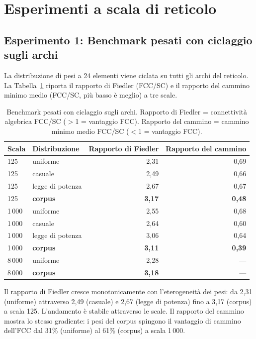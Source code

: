 \documentclass[11pt]{article}
\begin{document}
\section{Esperimenti a scala di reticolo}
\label{sec:lattice}

\subsection{Esperimento 1: Benchmark pesati con ciclaggio sugli archi}

La distribuzione di pesi a 24 elementi viene ciclata su tutti gli archi
del reticolo. La Tabella~\ref{tab:exp1} riporta il rapporto di Fiedler
(FCC/SC) e il rapporto del cammino minimo medio (FCC/SC, pi\`u basso
\`e meglio) a tre scale.

\begin{table}[H]
\centering
\caption{Benchmark pesati con ciclaggio sugli archi. Rapporto di
  Fiedler = connettivit\`a algebrica FCC/SC ($>$1 = vantaggio FCC).
  Rapporto del cammino = cammino minimo medio FCC/SC ($<$1 = vantaggio
  FCC).}
\label{tab:exp1}
\begin{tabular}{llrr}
\toprule
Scala & Distribuzione & Rapporto di Fiedler & Rapporto del cammino \\
\midrule
125  & uniforme   & 2,31 & 0,69 \\
125  & casuale    & 2,49 & 0,66 \\
125  & legge di potenza & 2,67 & 0,67 \\
125  & \textbf{corpus} & \textbf{3,17} & \textbf{0,48} \\
\midrule
1\,000  & uniforme   & 2,55 & 0,68 \\
1\,000  & casuale    & 2,64 & 0,60 \\
1\,000  & legge di potenza & 3,06 & 0,64 \\
1\,000  & \textbf{corpus} & \textbf{3,11} & \textbf{0,39} \\
\midrule
8\,000  & uniforme   & 2,28 & --- \\
8\,000  & \textbf{corpus} & \textbf{3,18} & --- \\
\bottomrule
\end{tabular}
\end{table}

Il rapporto di Fiedler cresce monotonicamente con l'eterogeneit\`a dei
pesi: da 2,31 (uniforme) attraverso 2,49 (casuale) e 2,67 (legge di
potenza) fino a 3,17 (corpus) a scala 125. L'andamento \`e stabile
attraverso le scale. Il rapporto del cammino mostra lo stesso
gradiente: i pesi del corpus spingono il vantaggio di cammino dell'FCC
dal 31\% (uniforme) al 61\% (corpus) a scala 1\,000.
\end{document}
